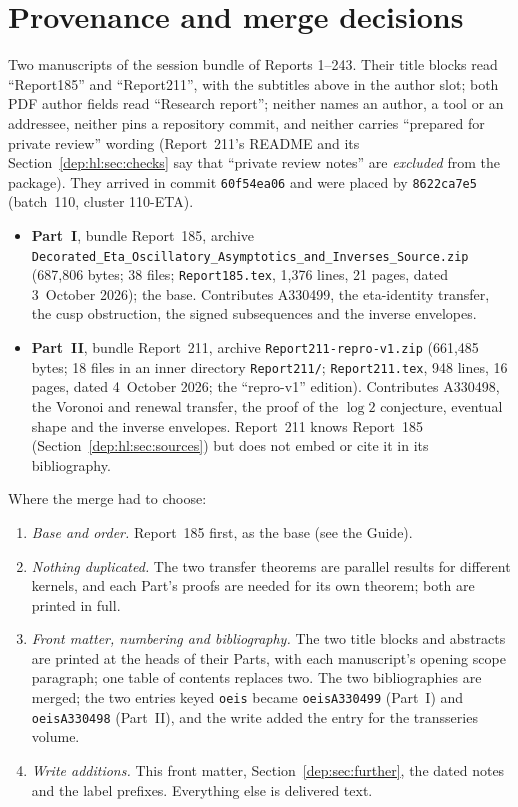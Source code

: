 \documentclass[11pt]{article}
\theoremstyle{definition}\newtheorem{definition}[theorem]{Definition}
\theoremstyle{remark}\newtheorem{remark}[theorem]{Remark}
\newcommand{\file}[1]{\nolinkurl{#1}}
\begin{document}
\section*{Provenance and merge decisions}\label{dep:sec:provenance}
Two manuscripts of the session bundle of Reports 1--243. Their title blocks
read ``Report185'' and ``Report211'', with the subtitles above in the author
slot; both PDF author fields read ``Research report''; neither names an
author, a tool or an addressee, neither pins a repository commit, and neither
carries ``prepared for private review'' wording (Report~211's README and its
Section~\ref{dep:hl:sec:checks} say that ``private review notes'' are
\emph{excluded} from the package). They arrived in commit \texttt{60f54ea06}
and were placed by \texttt{8622ca7e5} (batch~110, cluster 110-ETA).
\begin{itemize}
\item \textbf{Part~I}, bundle Report~185, archive
\file{Decorated_Eta_Oscillatory_Asymptotics_and_Inverses_Source.zip}
(687,806 bytes; 38 files; \file{Report185.tex}, 1,376 lines, 21 pages, dated
3~October 2026); the base. Contributes A330499, the eta-identity transfer, the
cusp obstruction, the signed subsequences and the inverse envelopes.
\item \textbf{Part~II}, bundle Report~211, archive
\file{Report211-repro-v1.zip} (661,485 bytes; 18 files in an inner directory
\file{Report211/}; \file{Report211.tex}, 948 lines, 16 pages, dated
4~October 2026; the ``repro-v1'' edition). Contributes A330498, the Voronoi and
renewal transfer, the proof of the $\log2$ conjecture, eventual shape and the
inverse envelopes. Report~211 knows Report~185 (Section~\ref{dep:hl:sec:sources})
but does not embed or cite it in its bibliography.
\end{itemize}
Where the merge had to choose:
\begin{enumerate}
\item \emph{Base and order.} Report~185 first, as the base (see the Guide).
\item \emph{Nothing duplicated.} The two transfer theorems are parallel results
for different kernels, and each Part's proofs are needed for its own theorem;
both are printed in full.
\item \emph{Front matter, numbering and bibliography.} The two title blocks and
abstracts are printed at the heads of their Parts, with each manuscript's
opening scope paragraph; one table of contents replaces two. The two
bibliographies are merged; the two entries keyed \texttt{oeis} became
\texttt{oeisA330499} (Part~I) and \texttt{oeisA330498} (Part~II), and the write
added the entry for the transseries volume.
\item \emph{Write additions.} This front matter, Section~\ref{dep:sec:further},
the dated notes and the label prefixes. Everything else is delivered text.
\end{enumerate}
\end{document}
